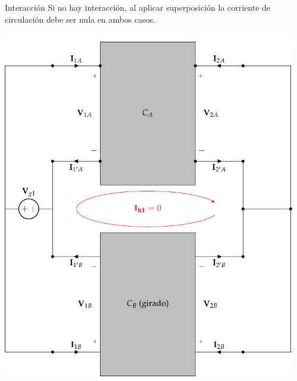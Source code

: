 \documentclass[aspectratio=169, usenames,svgnames,dvipsnames]{beamer}
\begin{document}
\begin{frame}[label={sec:orgb5934a5},plain]{Interacción}
Si no hay interacción, al aplicar superposición la corriente de circulación debe ser nula \alert{en ambos casos}.
\begin{columns}
\begin{column}{0.5\columnwidth}
\begin{center}
\includegraphics[height=0.8\textheight]{../figs/paralelo-paralelo-superposicion-entrada.pdf}
\end{center}
\end{column}
\begin{column}{0.5\columnwidth}
\begin{center}

\end{center}
\end{column}
\end{columns}
\end{frame}
\end{document}
